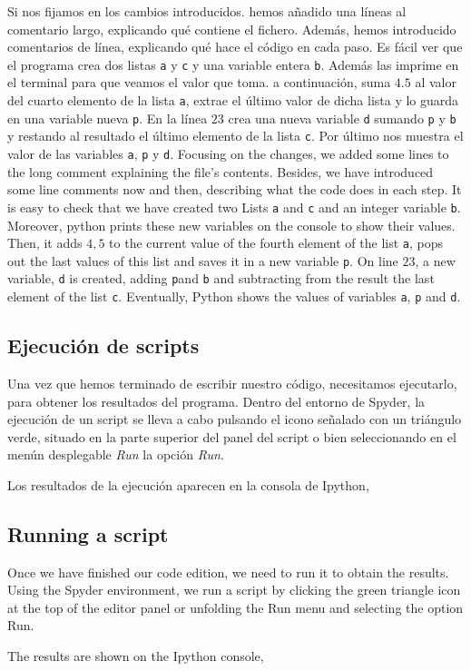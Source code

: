 \begin{paracol}{2}
Si nos fijamos en los cambios introducidos. hemos añadido una líneas al comentario largo, explicando qué contiene el fichero. Además, hemos introducido comentarios de línea, explicando qué hace el código en cada paso. Es fácil ver que el programa crea dos listas \texttt{a} y \texttt{c} y una variable entera \texttt{b}. Además las imprime en el terminal para que veamos el valor que toma. a continuación, suma $4.5$ al valor del cuarto elemento de la lista \texttt{a}, extrae el último valor de dicha lista y lo guarda en una variable nueva \texttt{p}. En la línea $23$ crea una nueva variable \texttt{d} sumando \texttt{p} y \texttt{b} y restando al resultado el último elemento de la lista \texttt{c}. Por último nos muestra el valor de las variables \texttt{a}, \texttt{p} y \texttt{d}.
\switchcolumn
Focusing on the changes, we added some lines to the long comment explaining the file's contents. Besides, we have introduced some line comments now and then, describing what the code does in each step. It is easy to check that we have created two Lists \texttt{a} and \texttt{c} and an integer variable \texttt{b}. Moreover, python prints these new variables on the console to show their values. Then, it adds $4,5$ to the current value of the fourth element of the list \texttt{a}, pops out the last values of this list and saves it in a new variable \texttt{p}. On line $23$, a new variable, \texttt{d} is created, adding  \texttt{p}and \texttt{b} and subtracting from the result the last element of the list \texttt{c}. Eventually, Python shows the values of variables \texttt{a}, \texttt{p} and \texttt{d}.

\switchcolumn
\subsection{Ejecución de scripts}
Una vez que hemos terminado de escribir nuestro código, necesitamos ejecutarlo, para obtener los resultados del programa. Dentro del entorno de Spyder, la ejecución de un script se lleva a cabo pulsando el icono señalado con un triángulo verde, situado en la parte superior del panel del script o bien seleccionando en el menún desplegable \emph{Run} la opción \emph{Run}.

Los resultados de la ejecución aparecen en la consola de Ipython,
\switchcolumn
\subsection{Running a script}
Once we have finished our code edition, we need to run it to obtain the results. Using the Spyder environment, we run a script by clicking the green triangle icon at the top of the editor panel or unfolding the Run menu and selecting the option Run.

The results are shown on the Ipython console,
\end{paracol}

